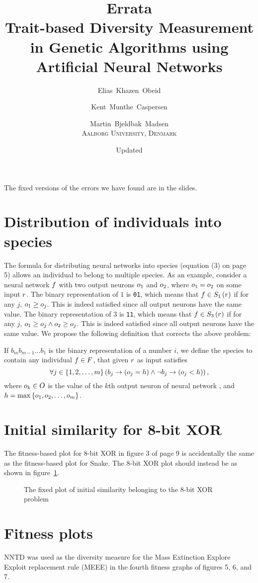 \documentclass{memoir}
\title{Errata\\
\Large Trait-based Diversity Measurement in Genetic Algorithms using Artificial Neural Networks}
\author{Elias~Khazen~Obeid \and
        Kent~Munthe~Caspersen \and
      Martin~Bjeldbak~Madsen\\
    \scshape Aalborg University, Denmark}
\date{Updated \formatdate{20}{6}{2014}}
\begin{document}
\pagestyle{empty}
\maketitle
\thispagestyle{empty}


The fixed versions of the errors we have found are in the slides.

\section*{Distribution of individuals into species}
The formula for distributing neural networks into species (equation (3) on page 5) allows an individual to belong to multiple species.
As an example, consider a neural network $f$ with two output neurons $o_1$ and $o_2$, where $o_1 = o_2$ on some input $r$.
The binary representation of $1$ is \texttt{01}, which means that $f \in S_{1}\left(r\right)$ if for any $j$, $o_1 \geq o_j$. This is indeed satisfied since all output neurons have the same value.
The binary representation of $3$ is \texttt{11}, which means that $f \in S_{3}\left(r\right)$ if for any $j$, $o_1 \geq o_j \wedge o_2 \geq o_j$. This is indeed satisfied since all output neurons have the same value. We propose the following definition that corrects the above problem:

If $b_{m}b_{m-1}\dots b_1$ is the binary representation of a number $i$, we define the species  to contain any individual $f \in F$, that given $r$ as input satisfies
\begin{equation*}
  \forall j \in \left\{1, 2,\dots,m\right\}\left(b_j \rightarrow \left(o_j = h\right) \land \neg b_j \rightarrow \left(o_j < h\right)\right),
\end{equation*}
where $o_k \in O$ is the value of the $k$th output neuron of neural network \ind, and $h = \max\left\{o_1, o_2, \dots, o_m\right\}$.

\section*{Initial similarity for 8-bit XOR}
The fitness-based plot for 8-bit XOR in figure 3 of page 9 is accidentally the same as the fitness-based plot for Snake. 
The 8-bit XOR plot should instead be as shown in figure~\ref{fig:initial-similarity-xor}.

\begin{figure}[htbp]
  \centering
  \resizebox{0.5\linewidth}{!}{%
  
}
  \caption{The fixed plot of initial similarity belonging to the 8-bit XOR problem}\label{fig:initial-similarity-xor}
\end{figure}

\section*{Fitness plots}
NNTD was used as the diversity measure for the Mass Extinction Explore Exploit replacement rule (MEEE) in the fourth fitness graphs of figures 5, 6, and 7.
\end{document}
